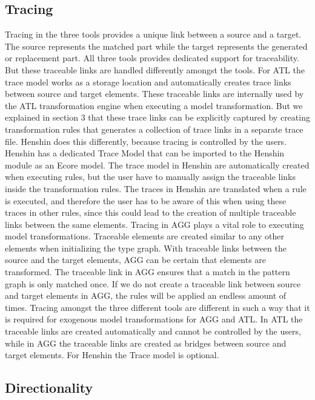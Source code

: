 \subsection{Tracing}

Tracing in the three tools provides a unique link
between a source and a target. The source represents the matched part while the
target represents the generated or replacement part. All three tools provides
dedicated support for traceability. But these traceable links are handled
differently amongst the tools. For ATL the trace model works as a storage
location and automatically creates trace links between source and target
elements. These traceable links are internally used by the ATL
transformation engine when executing a model transformation. But we explained in
section 3 that these trace links can be explicitly captured by creating
transformation rules that generates a collection of trace links in a
separate trace file. Henshin does this differently, because tracing is
controlled by the users. Henshin has a dedicated Trace Model that can be
imported to the Henshin module as an Ecore model. The trace model in Henshin
are automatically created when executing rules, but the user have to manually
assign the traceable links inside the transformation rules. The traces in
Henshin are translated when a rule is executed, and therefore the user has to
be aware of this when using these traces in other rules, since this
could lead to the creation of multiple traceable links between the same
elements. Tracing in AGG plays a vital role to executing model transformations.
Traceable elements are created similar to any other elements when initializing
the type graph. With traceable links between the source and the
target elements, AGG can be certain that elements are transformed. The traceable
link in AGG ensures that a match in the pattern graph is only matched once. If we do
not create a traceable link between source and target elements in AGG, the
rules will be applied an endless amount of times. Tracing amongst the three
different tools are different in such a way that it is required for exogenous
model transformations for AGG and ATL. In ATL the traceable links are created
automatically and cannot be controlled by the users, while in AGG the traceable
links are created as bridges between source and target elements. For Henshin
the Trace model is optional. 

\subsection{Directionality}

